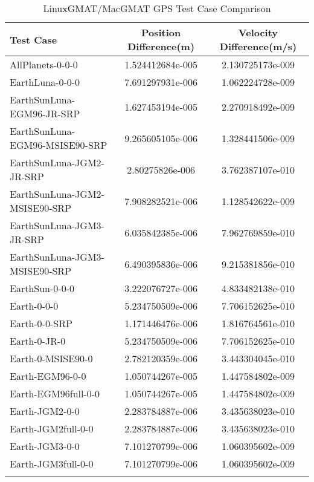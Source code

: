\begin{table}[htbp!]
\centering
\caption{ LinuxGMAT/MacGMAT GPS Test Case Comparison}
      \begin{tabular}{lcc}
      \hline\hline
          Test Case & Position Difference(m) & Velocity Difference(m/s) \\
         \hline
         AllPlanets-0-0-0 & 1.524412684e-005 & 2.130725173e-009 \\
         EarthLuna-0-0-0 & 7.691297931e-006 & 1.062224728e-009 \\
         EarthSunLuna-EGM96-JR-SRP & 1.627453194e-005 & 2.270918492e-009 \\
         EarthSunLuna-EGM96-MSISE90-SRP & 9.265605105e-006 & 1.328441506e-009 \\
         EarthSunLuna-JGM2-JR-SRP & 2.80275826e-006 & 3.762387107e-010 \\
         EarthSunLuna-JGM2-MSISE90-SRP & 7.908282521e-006 & 1.128542622e-009 \\
         EarthSunLuna-JGM3-JR-SRP & 6.035842385e-006 & 7.962769859e-010 \\
         EarthSunLuna-JGM3-MSISE90-SRP & 6.490395836e-006 & 9.215381856e-010 \\
         EarthSun-0-0-0 & 3.222076727e-006 & 4.833482138e-010 \\
         Earth-0-0-0 & 5.234750509e-006 & 7.706152625e-010 \\
         Earth-0-0-SRP & 1.171446476e-006 & 1.816764561e-010 \\
         Earth-0-JR-0 & 5.234750509e-006 & 7.706152625e-010 \\
         Earth-0-MSISE90-0 & 2.782120359e-006 & 3.443304045e-010 \\
         Earth-EGM96-0-0 & 1.050744267e-005 & 1.447584802e-009 \\
         Earth-EGM96full-0-0 & 1.050744267e-005 & 1.447584802e-009 \\
         Earth-JGM2-0-0 & 2.283784887e-006 & 3.435638023e-010 \\
         Earth-JGM2full-0-0 & 2.283784887e-006 & 3.435638023e-010 \\
         Earth-JGM3-0-0 & 7.101270799e-006 & 1.060395602e-009 \\
         Earth-JGM3full-0-0 & 7.101270799e-006 & 1.060395602e-009 \\
      \hline\hline
      \label{Table: GPS LinuxGMAT-MacGMAT Table} 
\end{tabular}
\end{table}
